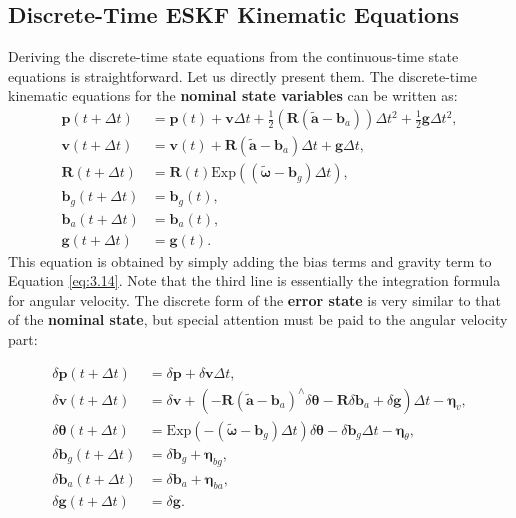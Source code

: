 \subsection{Discrete-Time ESKF Kinematic Equations}  
Deriving the discrete-time state equations from the continuous-time state equations is straightforward. Let us directly present them. The discrete-time kinematic equations for the \textbf{nominal state variables} can be written as:  
\begin{subequations}\label{key}  
	\begin{align}  
		\mathbf{p}(t+\Delta t) &= \mathbf{p}(t) + \mathbf{v} \Delta t + \frac{1}{2}   
		\left(\mathbf{R}(\tilde{\mathbf{a}}-\mathbf{b}_a) \right) \Delta t^2 + \frac{1}{2} \mathbf{g} \Delta t^2, \\  
		\mathbf{v}(t+\Delta t) &= \mathbf{v}(t) + \mathbf{R} (\tilde{\mathbf{a}} - \mathbf{b}_a) \Delta t + \mathbf{g} \Delta t,	\\  
		\mathbf{R}(t+\Delta t) &= \mathbf{R}(t) \mathrm{Exp} \left( (\tilde{\boldsymbol{\omega}}-\mathbf{b}_g)   
		\Delta t \right),\\  
		\mathbf{b}_g(t+\Delta t) &= \mathbf{b}_g(t), \\  
		\mathbf{b}_a(t+\Delta t) &= \mathbf{b}_a(t), \\  
		\mathbf{g}(t+\Delta t) &= \mathbf{g}(t) .  
	\end{align}  
\end{subequations}  
This equation is obtained by simply adding the bias terms and gravity term to Equation \eqref{eq:3.14}. Note that the third line is essentially the integration formula for angular velocity. The discrete form of the \textbf{error state} is very similar to that of the \textbf{nominal state}, but special attention must be paid to the angular velocity part:  

\begin{subequations}\label{eq:eskf-motion-equation}  
	\begin{align}  
		\delta \mathbf{p}(t+\Delta t) &= \delta \mathbf{p} + \delta \mathbf{v} \Delta t, \\  
		\delta \mathbf{v}(t+\Delta t) &= \delta \mathbf{v} + \left( - \mathbf{R}(\tilde{\mathbf{a}} - \mathbf{b}_a)^\wedge   
		\delta \boldsymbol{\theta} - \mathbf{R} \delta \mathbf{b}_a  + \delta \mathbf{g} \right) \Delta t -  
		\boldsymbol{\eta}_{v}, \\  
		\delta \boldsymbol{\theta} (t+\Delta t) &= \mathrm{Exp}\left( -(\tilde{\boldsymbol{\omega}} -   
		\mathbf{b}_g) \Delta t \right) \delta \boldsymbol{\theta} - \delta \mathbf{b}_g \Delta t -   
		\boldsymbol{\eta}_{\theta}, \\  
		\delta \mathbf{b}_g (t+\Delta t) &= \delta \mathbf{b}_g + \boldsymbol{\eta}_{bg}, \\  
		\delta \mathbf{b}_a (t+\Delta t)&= \delta \mathbf{b}_a + \boldsymbol{\eta}_{ba}, \\  
		\delta \mathbf{g} (t+\Delta t) &= \delta \mathbf{g}.  
	\end{align}  
\end{subequations}  

